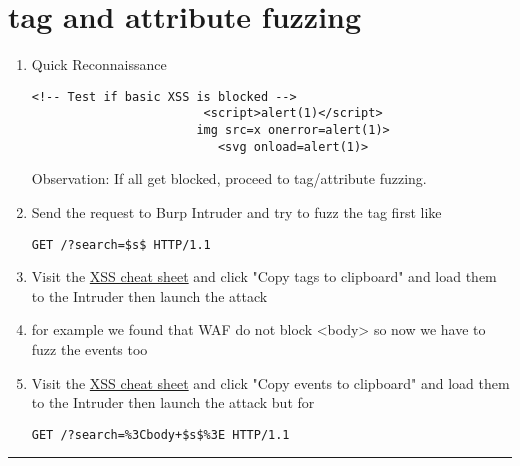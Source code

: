 \documentclass{article}
\begin{document}
\section*{tag and attribute fuzzing}
\begin{enumerate}
      \item Quick Reconnaissance
            \begin{lstlisting}[frame=single]
                    <!-- Test if basic XSS is blocked -->
                        <script>alert(1)</script>
                       img src=x onerror=alert(1)>
                          <svg onload=alert(1)>
            \end{lstlisting}
      Observation: If all get blocked, proceed to tag/attribute fuzzing.
      \item Send the request to Burp Intruder and try to fuzz the tag first like
            \begin{lstlisting}[frame=single]
                  GET /?search=$s$ HTTP/1.1
            \end{lstlisting}
      \item Visit the \href{https://portswigger.net/web-security/cross-site-scripting/cheat-sheet}{XSS cheat sheet} and click "Copy tags to clipboard" and load them to the Intruder then launch the attack
      \item for example we found that WAF do not block <body> so now we have to fuzz the events too
      \item Visit the \href{https://portswigger.net/web-security/cross-site-scripting/cheat-sheet}{XSS cheat sheet} and click "Copy events to clipboard" and load them to the Intruder then launch the attack but for
             \begin{lstlisting}[frame=single]
                  GET /?search=%3Cbody+$s$%3E HTTP/1.1
             \end{lstlisting}  
\end{enumerate}

\rule{15cm}{0.6pt}
\end{document}
